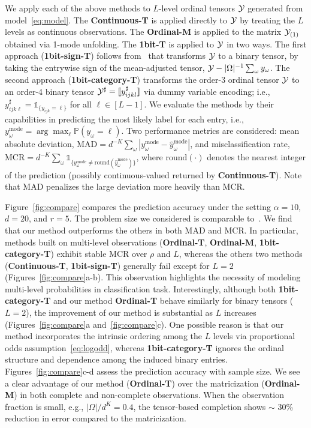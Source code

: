 \documentclass[11pt]{article}
\theoremstyle{plain}
\theoremstyle{definition}
\begin{document}
We apply each of the above methods to $L$-level ordinal tensors $\mathcal{Y}$ generated from model~\eqref{eq:model}. The {\bf Continuous-T} is applied directly to $\mathcal{Y}$ by treating the $L$ levels as continuous observations. The {\bf Ordinal-M} is applied to the matrix $\mathcal{Y}_{(1)}$ obtained via 1-mode unfolding. The {\bf 1bit-T} is applied to $\mathcal{Y}$ in two ways. The first approach ({\bf 1bit-sign-T}) follows from~\citet{ghadermarzy2018learning} that transforms
$\mathcal{Y}$ to a binary tensor, by taking the entrywise sign of the mean-adjusted tensor, $\mathcal{Y}- |\Omega|^{-1}\sum_\omega y_\omega$. The second approach ({\bf 1bit-category-T}) transforms the order-3 ordinal tensor $\mathcal{Y}$ to an order-4 binary tensor $\mathcal{Y}^{\sharp}=\llbracket y^{\sharp}_{ijkl} \rrbracket$ via dummy variable encoding; i.e., $y^{\sharp}_{ijk\ell}=\mathds{1}_{\{y_{ijk}=\ell\}}$ for all $\ell\in[L-1]$.
We evaluate the methods by their capabilities in predicting the most likely label for each entry, i.e.,\ $y_\omega^{\text{mode}}=\arg\max_\ell\mathbb{P}(y_\omega=\ell)$. Two performance metrics are considered: mean absolute deviation, $\text{MAD}=d^{-K}\sum_\omega |y_\omega^{\text{mode}}-\hat y_\omega^{\text{mode}}|$, and misclassification rate, $\text{MCR}=d^{-K}\sum_\omega\mathds{1}_{\{y_\omega^{\text{mode}}\neq\text{round}(\hat y_\omega^{\text{mode}})\}}$,
where $\text{round}(\cdot)$ denotes the nearest integer of the prediction (possibly continuous-valued returned by {\bf Continuous-T}). Note that MAD penalizes the large deviation more heavily than MCR.


Figure~\ref{fig:compare} compares the prediction accuracy under the setting $\alpha=10$, $d=20$, and $r=5$. The problem size we considered is comparable to~\citet{ghadermarzy2018learning}. We find that our method outperforms the others in both MAD and MCR. In particular, methods built on multi-level observations ({\bf Ordinal-T}, {\bf Ordinal-M}, {\bf 1bit-category-T}) exhibit stable MCR over $\rho$ and $L$, whereas the others two methods ({\bf Continuous-T}, {\bf 1bit-sign-T}) generally fail except for $L=2$ (Figures~\ref{fig:compare}a-b). This observation highlights the necessity of modeling multi-level probabilities in classification task. Interestingly, although both {\bf 1bit-category-T} and our method {\bf Ordinal-T} behave similarly for binary tensors ($L=2$), the improvement of our method is substantial as $L$ increases (Figures~\ref{fig:compare}a and~\ref{fig:compare}c). One possible reason is that our method incorporates the intrinsic ordering among the $L$ levels via proportional odds assumption~\eqref{eq:logodd}, whereas {\bf 1bit-category-T} ignores the ordinal structure and dependence among the induced binary entries. Figures~\ref{fig:compare}c-d assess the prediction accuracy with sample size. We see a clear advantage of our method ({\bf Ordinal-T}) over the matricization ({\bf Ordinal-M}) in both complete and non-complete observations. When the observation fraction is small, e.g., ${|\Omega|/ d^K}=0.4$, the tensor-based completion shows $\sim$ 30\% reduction in error compared to the matricization.
\end{document}
